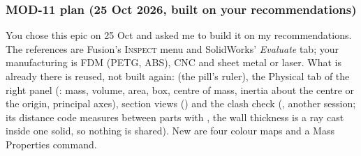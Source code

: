 \subsubsection*{MOD-11 plan (25 Oct 2026, built on your recommendations)}\label{sec:mod11-plan}

You chose this epic on 25 Oct and asked me to build it on my recommendations. The references are Fusion's
\textsc{Inspect} menu and SolidWorks' \emph{Evaluate} tab; your manufacturing is FDM (PETG, ABS), CNC and sheet metal
or laser. What is already there is reused, not built again:  (the pill's ruler), the Physical tab
of the right panel (: mass, volume, area, box, centre of mass, inertia about the centre or the origin,
principal axes), section views () and the clash check (, another session; its distance code
measures between parts with , the wall thickness is a ray cast inside one solid, so nothing is
shared). New are four colour maps and a Mass Properties command.

